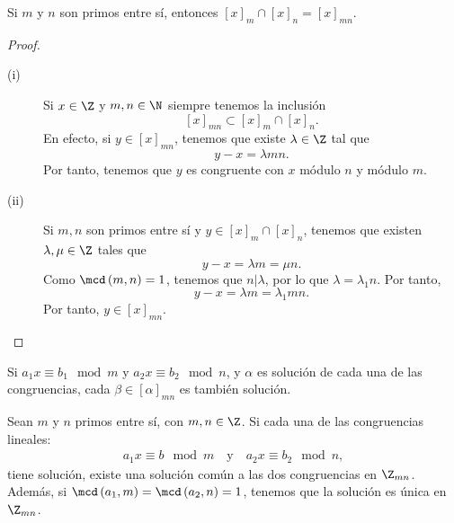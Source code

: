 \begin{fprop}[]
	\normalfont Si $\displaystyle m $ y $\displaystyle n $ son primos entre sí, entonces $\displaystyle \left[x\right]_{m} \cap \left[x\right] _{n} = \left[x\right] _{mn} $.
\end{fprop}
\begin{proof}
\begin{description}
\item[(i)] Si $\displaystyle x \in \Z $ y $\displaystyle m,n \in \N $ siempre tenemos la inclusión 
	\[\left[x\right] _{mn} \subset \left[x\right]_{m} \cap \left[x\right] _{n} .\]
	En efecto, si $\displaystyle y \in \left[x\right] _{mn} $, tenemos que existe $\displaystyle \lambda \in \Z $ tal que 
	\[ y - x = \lambda mn .\]
Por tanto, tenemos que $\displaystyle y $ es congruente con $\displaystyle x $ módulo $\displaystyle n $ y módulo $\displaystyle m $.
\item[(ii)] Si $\displaystyle m,n $ son primos entre sí y $\displaystyle y \in \left[x\right]_{m} \cap \left[x\right] _{n} $, tenemos que existen $\displaystyle \lambda, \mu \in \Z $ tales que
	\[y - x = \lambda m = \mu n .\]
Como $\displaystyle \mcd\left(m,n\right) = 1 $, tenemos que $\displaystyle n | \lambda $, por lo que $\displaystyle \lambda = \lambda_{1} n $. Por tanto, 
\[y - x = \lambda m = \lambda_{1}mn .\]
Por tanto, $\displaystyle y \in \left[x\right] _{mn} $.
\end{description}

\end{proof}

\begin{observation}
\normalfont Si $\displaystyle a_{1}x \equiv b_{1} \mod m $ y $\displaystyle a_{2}x\equiv b_{2} \mod n $, y $\displaystyle \alpha  $ es solución de cada una de las congruencias, cada $\displaystyle \beta \in \left[\alpha \right] _{mn} $ es también solución. 
\end{observation}

\begin{ftheorem}[]
\normalfont Sean $\displaystyle m  $ y $\displaystyle n $ primos entre sí, con $\displaystyle m,n \in \Z $. Si cada una de las congruencias lineales:
\[
\begin{split}
a_{1}x \equiv b \mod m \quad \text{y} \quad a_{2}x\equiv b_{2} \mod n,
\end{split}
\]
tiene solución, existe una solución común a las dos congruencias en $\displaystyle \Z_{mn} $. Además, si $\displaystyle \mcd\left(a_{1}, m\right) = \mcd\left(a_{2}, n\right)=1 $, tenemos que la solución es única en $\displaystyle \Z_{mn} $.
\end{ftheorem}

